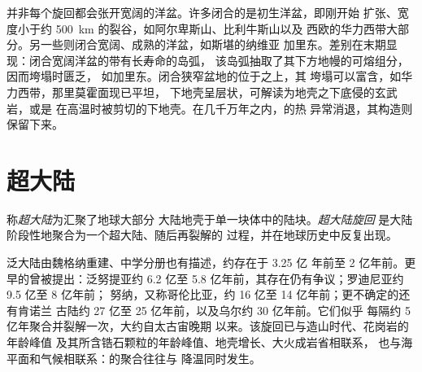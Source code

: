 并非每个旋回都会张开宽阔的洋盆。许多闭合的是初生洋盆，即刚开始
扩张、宽度小于约 \qty{500}{km} 的裂谷，如阿尔卑斯山、比利牛斯山以及
西欧的华力西带大部分。另一些则闭合宽阔、成熟的洋盆，如斯堪的纳维亚
加里东。差别在末期显现：闭合宽阔洋盆的带有长寿命的岛弧，
该岛弧抽取了其下方地幔的可熔组分，因而垮塌时匮乏，
如加里东。闭合狭窄盆地的位于之上，其
垮塌可以富含，如华力西带，那里莫霍面现已平坦，
下地壳呈层状，可解读为地壳之下底侵的玄武岩，或是
在高温时被剪切的下地壳。在几千万年之内，的热
异常消退，其构造则保留下来。

\section{超大陆}\label{sec:b2:wilson-cycle:supercontinents}

\begin{definition}\label{def:b2:wilson-cycle:supercontinent}
称\emph{超大陆}为汇聚了地球大部分
大陆地壳于单一块体中的陆块。\emph{超大陆旋回}
是大陆阶段性地聚合为一个超大陆、随后再裂解的
过程，并在地球历史中反复出现。
\end{definition}

泛大陆由魏格纳重建、中学分册也有描述，约存在于 3.25 亿
年前至 2 亿年前。更早的曾被提出：泛努提亚约 6.2 亿至
5.8 亿年前，其存在仍有争议；罗迪尼亚约 9.5 亿至 8 亿年前；
努纳，又称哥伦比亚，约 16 亿至 14 亿年前；更不确定的还有肯诺兰
古陆约 27 亿至 25 亿年前，以及乌尔约 30 亿年前。它们似乎
每隔约 5 亿年聚合并裂解一次，大约自太古宙晚期
以来。该旋回已与造山时代、花岗岩的年龄峰值
及其所含锆石颗粒的年龄峰值、地壳增长、大火成岩省相联系，
也与海平面和气候相联系：的聚合往往与
降温同时发生。

